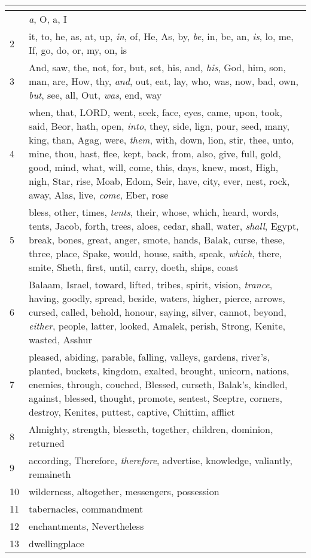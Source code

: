 \begin{center}
\begin{longtable}{l|p{3.75in}}
\hline \multicolumn{2}{c}{{ }} \\ \hline
\endfoot 
1 & \emph{a}, O, a, I\\ \hline 
2 & it, to, he, as, at, up, \emph{in}, of, He, As, by, \emph{be}, in, be, an, \emph{is}, lo, me, If, go, do, or, my, on, is\\ \hline 
3 & And, saw, the, not, for, but, set, his, and, \emph{his}, God, him, son, man, are, How, thy, \emph{and}, out, eat, lay, who, was, now, bad, own, \emph{but}, see, all, Out, \emph{was}, end, way\\ \hline 
4 & when, that, LORD, went, seek, face, eyes, came, upon, took, said, Beor, hath, open, \emph{into}, they, side, lign, pour, seed, many, king, than, Agag, were, \emph{them}, with, down, lion, stir, thee, unto, mine, thou, hast, flee, kept, back, from, also, give, full, gold, good, mind, what, will, come, this, days, knew, most, High, nigh, Star, rise, Moab, Edom, Seir, have, city, ever, nest, rock, away, Alas, live, \emph{come}, Eber, rose\\ \hline 
5 & bless, other, times, \emph{tents}, their, whose, which, heard, words, tents, Jacob, forth, trees, aloes, cedar, shall, water, \emph{shall}, Egypt, break, bones, great, anger, smote, hands, Balak, curse, these, three, place, Spake, would, house, saith, speak, \emph{which}, there, smite, Sheth, first, until, carry, doeth, ships, coast\\ \hline 
6 & Balaam, Israel, toward, lifted, tribes, spirit, vision, \emph{trance}, having, goodly, spread, beside, waters, higher, pierce, arrows, cursed, called, behold, honour, saying, silver, cannot, beyond, \emph{either}, people, latter, looked, Amalek, perish, Strong, Kenite, wasted, Asshur\\ \hline 
7 & pleased, abiding, parable, falling, valleys, gardens, river's, planted, buckets, kingdom, exalted, brought, unicorn, nations, enemies, through, couched, Blessed, curseth, Balak's, kindled, against, blessed, thought, promote, sentest, Sceptre, corners, destroy, Kenites, puttest, captive, Chittim, afflict\\ \hline 
8 & Almighty, strength, blesseth, together, children, dominion, returned\\ \hline 
9 & according, Therefore, \emph{therefore}, advertise, knowledge, valiantly, remaineth\\ \hline 
10 & wilderness, altogether, messengers, possession\\ \hline 
11 & tabernacles, commandment\\ \hline 
12 & enchantments, Nevertheless\\ \hline 
13 & dwellingplace\\ \hline 
\end{longtable}
\end{center}






